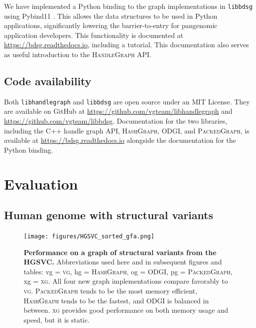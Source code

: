 \documentclass{bioinfo}
\begin{document}
\begin{methods}
We have implemented a Python binding to the graph implementations in \texttt{libbdsg} using Pybind11 \citep{pybind11}.
This allows the data structures to be used in Python applications, significantly lowering the barrier-to-entry for pangenomic application developers.
This functionality is documented at \url{https://bdsg.readthedocs.io}, including a tutorial.
This documentation also serves as useful introduction to the \textsc{HandleGraph} API.

\subsection{Code availability}

Both \texttt{libhandlegraph} and \texttt{libbdsg} are open source under an MIT License.
They are available on GitHub at \url{https://github.com/vgteam/libhandlegraph} and \url{https://github.com/vgteam/libbdsg}.
Documentation for the two libraries, including the C++ handle graph API, \textsc{HashGraph}, \textsc{ODGI}, and \textsc{PackedGraph}, is available at \url{https://bdsg.readthedocs.io} alongside the documentation for the Python binding.

\end{methods}



\section{Evaluation}

\subsection{Human genome with structural variants}

\begin{figure}
	\begin{center}
		\texttt{[image: figures/HGSVC\_sorted\_gfa.png]}
	\end{center}
	\caption{{\label{fig:hgsvc}
        \textbf{Performance on a graph of structural variants from the HGSVC.}
        Abbreviations used here and in subsequent figures and tables: vg = \textsc{vg}, hg = \textsc{HashGraph}, og = \textsc{ODGI}, pg = \textsc{PackedGraph}, xg = \textsc{xg}.
        All four new graph implementations compare favorably to \textsc{vg}.
        \textsc{PackedGraph} tends to be the most memory efficient, \textsc{HashGraph} tends to be the fastest, and \textsc{ODGI} is balanced in between.
        \textsc{xg} provides good performance on both memory usage and speed, but it is static.
        }
      }
\end{figure}
\end{document}
